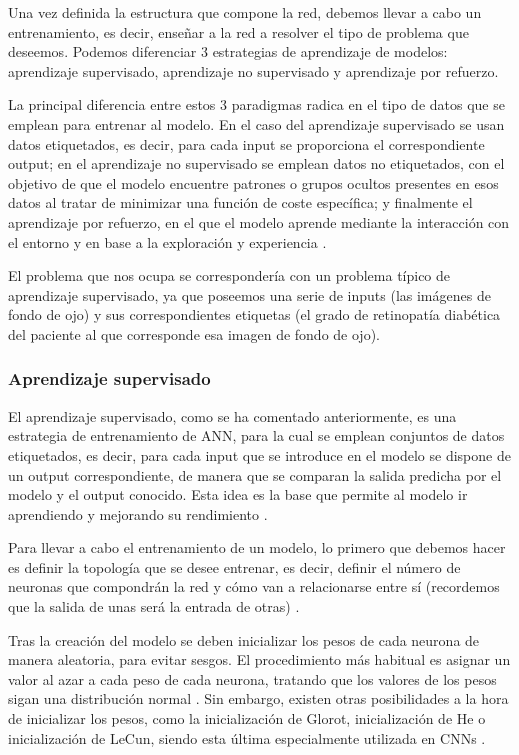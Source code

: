 Una vez definida la estructura que compone la red, debemos llevar a cabo un entrenamiento, es decir, enseñar a la red a resolver el tipo de problema que deseemos. Podemos diferenciar 3 estrategias de aprendizaje de modelos: aprendizaje supervisado, aprendizaje no supervisado y aprendizaje por refuerzo.

La principal diferencia entre estos 3 paradigmas radica en el tipo de datos que se emplean para entrenar al modelo. En el caso del aprendizaje supervisado se usan datos etiquetados, es decir, para cada input se proporciona el correspondiente output; en el aprendizaje no supervisado se emplean datos no etiquetados, con el objetivo de que el modelo encuentre patrones o grupos ocultos presentes en esos datos al tratar de minimizar una función de coste específica; y finalmente el aprendizaje por refuerzo, en el que el modelo aprende mediante la interacción con el entorno y en base a la exploración y experiencia \cite{ann:intro, cnn:osea}.

El problema que nos ocupa se correspondería con un problema típico de aprendizaje supervisado, ya que poseemos una serie de inputs (las imágenes de fondo de ojo) y sus correspondientes etiquetas (el grado de retinopatía diabética del paciente al que corresponde esa imagen de fondo de ojo).

\subsubsection{Aprendizaje supervisado}

El aprendizaje supervisado, como se ha comentado anteriormente, es una estrategia de entrenamiento de ANN, para la cual se emplean conjuntos de datos etiquetados, es decir, para cada input que se introduce en el modelo se dispone de un output correspondiente, de manera que se comparan la salida predicha por el modelo y el output conocido. Esta idea es la base que permite al modelo ir aprendiendo y mejorando su rendimiento \cite{cnn:osea}. 

Para llevar a cabo el entrenamiento de un modelo, lo primero que debemos hacer es definir la topología que se desee entrenar, es decir, definir el número de neuronas que compondrán la red y cómo van a relacionarse entre sí (recordemos que la salida de unas será la entrada de otras) \cite{cnn:biblia_deeplearning}.

Tras la creación del modelo se deben inicializar los pesos de cada neurona de manera aleatoria, para evitar sesgos. El procedimiento más habitual es asignar un valor al azar a cada peso de cada neurona, tratando que los valores de los pesos sigan una distribución normal \cite{cnn:biblia_deeplearning}. Sin embargo, existen otras posibilidades a la hora de inicializar los pesos, como la inicialización de Glorot, inicialización de He o inicialización de LeCun, siendo esta última especialmente utilizada en CNNs \cite{cnn:inicializacion}.

